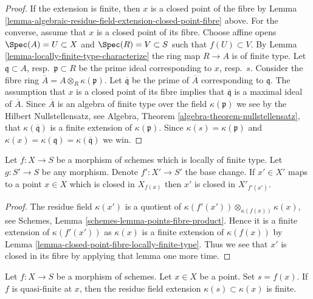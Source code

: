 \begin{proof}
If the extension is finite, then $x$ is a closed point of
the fibre by
Lemma \ref{lemma-algebraic-residue-field-extension-closed-point-fibre}
above. For the converse, assume that $x$ is a closed point
of its fibre. Choose affine opens $\Spec(A) = U \subset X$
and $\Spec(R) = V \subset S$ such that $f(U) \subset V$.
By Lemma \ref{lemma-locally-finite-type-characterize} the ring map
$R \to A$ is of finite type. Let $\mathfrak q \subset A$,
resp.\ $\mathfrak p \subset R$ be the prime ideal corresponding
to $x$, resp.\ $s$. Consider the fibre ring
$\overline{A} = A \otimes_R \kappa(\mathfrak p)$.
Let $\overline{\mathfrak q}$ be the prime of $\overline{A}$
corresponding to $\mathfrak q$. The assumption that $x$
is a closed point of its fibre implies that $\overline{\mathfrak q}$
is a maximal ideal of $\overline{A}$. Since $\overline{A}$
is an algebra of finite type over the field $\kappa(\mathfrak p)$
we see by the Hilbert Nullstellensatz, see
Algebra, Theorem \ref{algebra-theorem-nullstellensatz},
that $\kappa(\overline{\mathfrak q})$ is a finite extension
of $\kappa(\mathfrak p)$.
Since $\kappa(s) = \kappa(\mathfrak p)$ and
$\kappa(x) = \kappa(\mathfrak q) = \kappa(\overline{\mathfrak q})$
we win.
\end{proof}

\begin{lemma}
\label{lemma-base-change-closed-point-fibre-locally-finite-type}
Let $f : X \to S$ be a morphism of schemes which is locally of finite type.
Let $g : S' \to S$ be any morphism. Denote $f' : X' \to S'$ the base change.
If $x' \in X'$ maps to a point $x \in X$ which is closed in $X_{f(x)}$
then $x'$ is closed in $X'_{f'(x')}$.
\end{lemma}

\begin{proof}
The residue field $\kappa(x')$ is a quotient of
$\kappa(f'(x')) \otimes_{\kappa(f(x))} \kappa(x)$, see
Schemes, Lemma \ref{schemes-lemma-points-fibre-product}.
Hence it is a finite extension of $\kappa(f'(x'))$ as
$\kappa(x)$ is a finite extension of $\kappa(f(x))$ by
Lemma \ref{lemma-closed-point-fibre-locally-finite-type}.
Thus we see that $x'$ is closed in its fibre by applying that lemma
one more time.
\end{proof}

\begin{lemma}
\label{lemma-residue-field-quasi-finite}
Let $f : X \to S$ be a morphism of schemes.
Let $x \in X$ be a point. Set $s = f(x)$.
If $f$ is quasi-finite at $x$, then the residue field
extension $\kappa(s) \subset \kappa(x)$ is finite.
\end{lemma}

